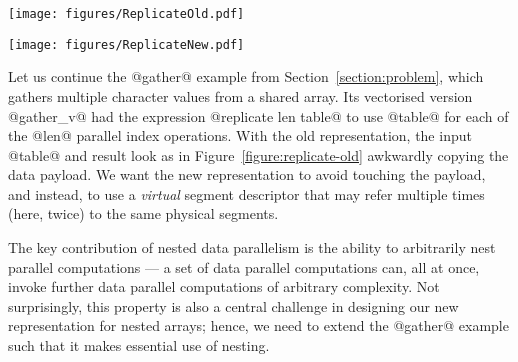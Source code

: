 \begin{figure*}
\begin{center}
\centering\texttt{[image: figures/ReplicateOld.pdf]}
\caption{The function replicate using the old representation}
\end{center}
\label{figure:replicate-old}
\end{figure*}
%
\begin{figure*}
\begin{center}
\centering\texttt{[image: figures/ReplicateNew.pdf]}
\caption{The function replicate using virtual segments in the new representation}
\end{center}
\label{figure:replicate-new}
\end{figure*}
%
Let us continue the @gather@ example from Section~\ref{section:problem}, which gathers multiple character values from a shared array. Its vectorised version @gather_v@ had the expression @replicate len table@ to use @table@ for each of the @len@ parallel index operations.  With the old representation, the input @table@ and result look as in Figure~\ref{figure:replicate-old} awkwardly copying the data payload.  We want the new representation to avoid touching the payload, and instead, to use a \emph{virtual} segment descriptor that may refer multiple times (here, twice) to the same physical segments.

The key contribution of nested data parallelism is the ability to arbitrarily nest parallel computations --- a set of data parallel computations can, all at once, invoke further data parallel computations of arbitrary complexity.  Not surprisingly, this property is also a central challenge in designing our new representation for nested arrays; hence, we need to extend the @gather@ example such that it makes essential use of nesting.

